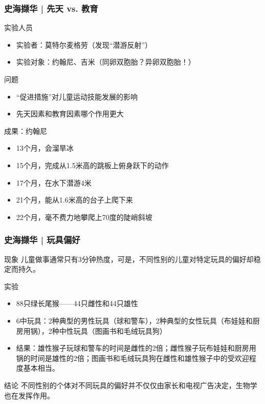 \begin{frame}
  \frametitle{史海撷华 | 先天 vs. 教育}
  \begin{block}{实验人员}
    \begin{itemize}
      \item 实验者：莫特尔\textbullet 麦格劳（发现“潜游反射”）
      \item 实验对象：约翰尼、吉米（同卵双胞胎？异卵双胞胎！）
    \end{itemize}
  \end{block}
  \vspace{-0.5em}
  \pause
  \begin{block}{问题}
    \begin{itemize}
      \item “促进措施”对儿童运动技能发展的影响
      \item 先天因素和教育因素哪个作用更大
    \end{itemize}
  \end{block}
  \vspace{-0.5em}
  \pause
  \begin{block}{成果：约翰尼}
    \begin{itemize}
      \item 13个月，会溜旱冰
      \item 15个月，完成从1.5米高的跳板上俯身跃下的动作
      \item 17个月，在水下潜游4米
      \item 21个月，能从1.6米高的台子上爬下来
      \item 22个月，毫不费力地攀爬上70度的陡峭斜坡
    \end{itemize}
  \end{block}
\end{frame}

\begin{frame}
  \frametitle{史海撷华 | 玩具偏好}
  \begin{block}{现象}
    儿童做事通常只有3分钟热度，可是，不同性别的儿童对特定玩具的偏好却稳定而持久。
  \end{block}
  \vspace{-0.5em}
  \pause
  \begin{block}{实验}
    \begin{itemize}
      \item 88只绿长尾猴——44只雌性和44只雄性
      \item 6中玩具：2种典型的男性玩具（球和警车），2种典型的女性玩具（布娃娃和厨房用锅），2种中性玩具（图画书和毛绒玩具狗）
      \item 结果：雄性猴子玩球和警车的时间是雌性的2倍；雌性猴子玩布娃娃和厨房用锅的时间是雄性的2倍；图画书和毛绒玩具狗在雌性和雄性猴子中的受欢迎程度基本相当。
    \end{itemize}
  \end{block}
  \vspace{-0.5em}
  \pause
  \begin{block}{结论}
    不同性别的个体对不同玩具的偏好并不仅仅由家长和电视广告决定，生物学也在发挥作用。
  \end{block}
\end{frame}



